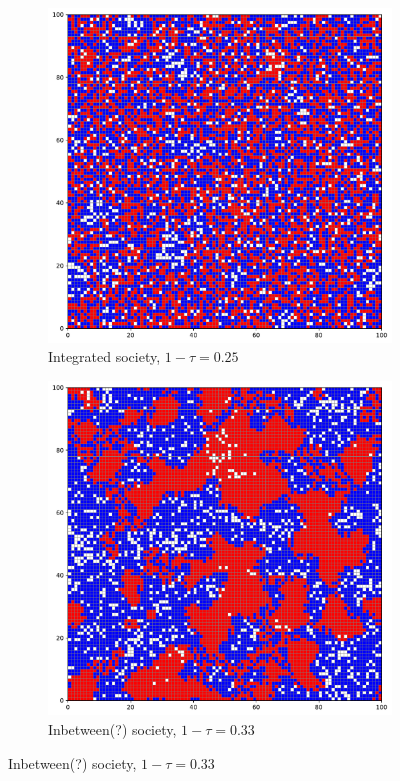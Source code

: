 \documentclass[../main.tex]{subfiles}
\begin{document}
\begin{figure}[H]
\centering
\caption{Schelling model simulations}
	\begin{subfigure}{0.45\textwidth}	
	\centering
    \caption{Integrated society, $1-\tau = 0.25$}
	\includegraphics[width=\textwidth]{figs/schelling_model_0.25.pdf}	
	\end{subfigure}	
	\begin{subfigure}{0.45\textwidth}	
	\centering
    \caption{Inbetween(?) society, $1-\tau = 0.33$}
	\includegraphics[width=\textwidth]{figs/schelling_model_0.33.pdf}	

\end{subfigure}
\end{figure}
\end{document}
